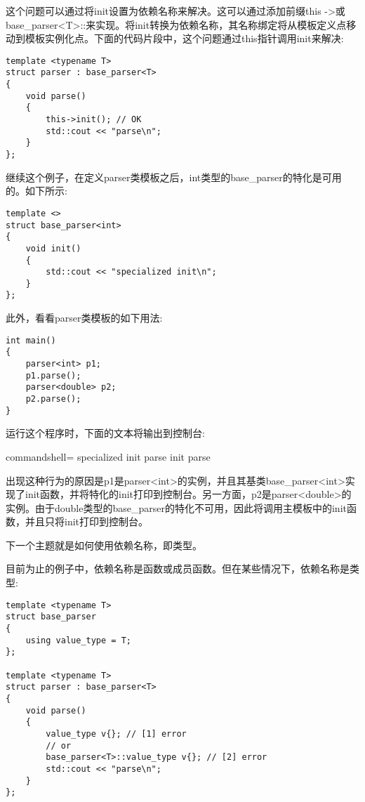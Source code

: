 这个问题可以通过将init设置为依赖名称来解决。这可以通过添加前缀this ->或base\_parser<T>::来实现。将init转换为依赖名称，其名称绑定将从模板定义点移动到模板实例化点。下面的代码片段中，这个问题通过this指针调用init来解决:

\begin{lstlisting}[style=styleCXX]
template <typename T>
struct parser : base_parser<T>
{
	void parse()
	{
		this->init(); // OK
		std::cout << "parse\n";
	}
};
\end{lstlisting}

继续这个例子，在定义parser类模板之后，int类型的base\_parser的特化是可用的。如下所示:

\begin{lstlisting}[style=styleCXX]
template <>
struct base_parser<int>
{
	void init()
	{
		std::cout << "specialized init\n";
	}
};
\end{lstlisting}

此外，看看parser类模板的如下用法:

\begin{lstlisting}[style=styleCXX]
int main()
{
	parser<int> p1;
	p1.parse();
	parser<double> p2;
	p2.parse();
}
\end{lstlisting}

运行这个程序时，下面的文本将输出到控制台:

\begin{tcblisting}{commandshell={}}
specialized init
parse
init
parse
\end{tcblisting}

出现这种行为的原因是p1是parser<int>的实例，并且其基类base\_parser<int>实现了init函数，并将特化的init打印到控制台。另一方面，p2是parser<double>的实例。由于double类型的base\_parser的特化不可用，因此将调用主模板中的init函数，并且只将init打印到控制台。

下一个主题就是如何使用依赖名称，即类型。


目前为止的例子中，依赖名称是函数或成员函数。但在某些情况下，依赖名称是类型:

\begin{lstlisting}[style=styleCXX]
template <typename T>
struct base_parser
{
	using value_type = T;
};

template <typename T>
struct parser : base_parser<T>
{
	void parse()
	{
		value_type v{}; // [1] error
		// or
		base_parser<T>::value_type v{}; // [2] error
		std::cout << "parse\n";
	}
};
\end{lstlisting}

